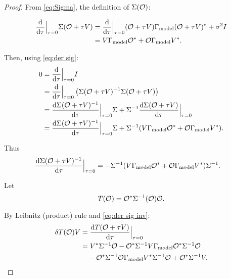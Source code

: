 \begin{proof}  
  From \eqref{eq:Sigma}, the definition of $\Sigma(\mathcal{O})$:

  \begin{align}\label{eq:der sig}
    \begin{split}
      \frac{\der}{\der \tau} \Big |_{\tau=0} \Sigma( \obs + \tau V )
      &= \frac{\der}{\der \tau} \Big |_{\tau=0} 
      (\obs + \tau V ) \modcov (\obs + \tau V )^*  + \sigma^2I\\
      &= V \modcov \obs^* + \obs \modcov V^*.
    \end{split}
  \end{align}

  Then, using \eqref{eq:der sig}: 
  \begin{align*}
    0 &= \frac{\der}{\der \tau} \Big |_{\tau=0} I \\
    &= \frac{\der}{\der \tau} \Big |_{\tau=0}
    \left (\Sigma(\obs+\tau V)^{-1} \Sigma(\obs+\tau V) \right ) \\
    &= \frac{\der \Sigma(\obs+\tau V)^{-1}}{\der \tau} \Big |_{\tau=0} \Sigma+
    \Sigma^{-1} \frac{\der \Sigma(\obs+\tau V)}{\der \tau} \Big |_{\tau=0}\\  
    &= \frac{\der \Sigma(\obs+\tau V)^{-1}}{\der \tau} \Big |_{\tau=0} \Sigma+
    \Sigma^{-1} (V\modcov \obs^* + \obs \modcov V^*). 
  \end{align*}

  Thus
  \begin{align}\label{eq:der sig inv}
    \frac{\der \Sigma(\obs+\tau V)^{-1}}{\der \tau} \Big |_{\tau=0}  
      &= -\Sigma^{-1} (V \modcov \obs^* + \obs \modcov V^*) \Sigma^{-1}.
    \end{align}

  Let
  \begin{equation*}
    T(\obs) = \obs^* \Sigma^{-1}(\obs)\obs.
  \end{equation*}
  
  By Leibnitz (product) rule and \eqref{eq:der sig inv}:
  \begin{align}\label{eq:T}
    \begin{split}
    \delta T(\obs) V 
    &= \frac{\der T(\obs + \tau V)}{\der \tau} \Big |_{\tau=0} \\
    &= V^* \Sigma^{-1} \obs 
    - \obs^*\Sigma^{-1} V\modcov \obs^* \Sigma^{-1}\obs \\
    &\ \ \ - \obs^* \Sigma^{-1} \obs \modcov V^* \Sigma^{-1}\obs
    + \obs^* \Sigma^{-1} V.
    \end{split}
  \end{align}



\end{proof}
